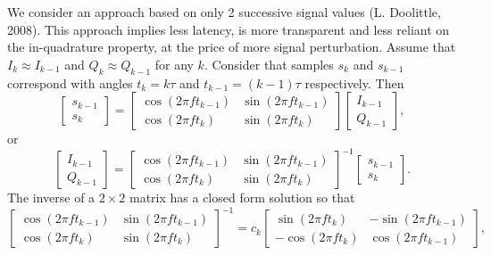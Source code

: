 \documentclass[12pt]{amsart}
\begin{document}
We consider an approach based on only 2 successive signal values (L. Doolittle, 2008).
This approach implies less latency, is more transparent and less reliant on the in-quadrature property,
at the price of more signal perturbation.
Assume that $I_k\approx I_{k-1}$ and $Q_k\approx Q_{k-1}$ for any $k$. 
Consider that samples $s_k$ and $s_{k-1}$ correspond with angles $t_k=k\tau$ and $t_{k-1}=(k-1)\tau$ respectively.
Then
\begin{equation}
	\begin{bmatrix}
		s_{k-1} \\
		s_{k}
	\end{bmatrix}
	=
	\begin{bmatrix}
		\cos\left(2\pi f t_{k-1} \right) &
		\sin\left(2\pi f  t_{k-1}\right) \\
		\cos\left(2\pi f t_{k}\right) &
		\sin\left(2\pi f t_{k} \right) 
	\end{bmatrix}
	\begin{bmatrix}
		I_{k-1} \\
		Q_{k-1}
	\end{bmatrix},
	\label{eq.neariqsys}
\end{equation}
or 
\begin{equation}
	\begin{bmatrix}
		I_{k-1} \\
		Q_{k-1}
	\end{bmatrix}
	= \begin{bmatrix}
		\cos\left(2\pi f t_{k-1} \right) &
		\sin\left(2\pi f  t_{k-1}\right) \\
		\cos\left(2\pi f t_{k}\right) &
		\sin\left(2\pi f t_{k} \right) 
	\end{bmatrix}^{-1}
	\begin{bmatrix}
		s_{k-1} \\
		s_{k}
	\end{bmatrix}.
	\label{eq.neariqsys2}
\end{equation}
The inverse of a $2\times 2$ matrix has a closed form solution so that 
\begin{equation}
	\begin{bmatrix}
		\cos\left(2\pi f t_{k-1} \right) &
		\sin\left(2\pi f  t_{k-1}\right) \\
		\cos\left(2\pi f t_{k}\right) &
		\sin\left(2\pi f t_{k} \right) 
	\end{bmatrix}^{-1}
	= 
	c_k
	\begin{bmatrix}
		\sin\left(2\pi f t_{k} \right) &
		- \sin\left(2\pi f  t_{k-1}\right) \\
		- \cos\left(2\pi f t_{k}\right) &
		\cos\left(2\pi f t_{k-1} \right) 
	\end{bmatrix},
	\label{eq.inv2x2}
\end{equation}
\end{document}
